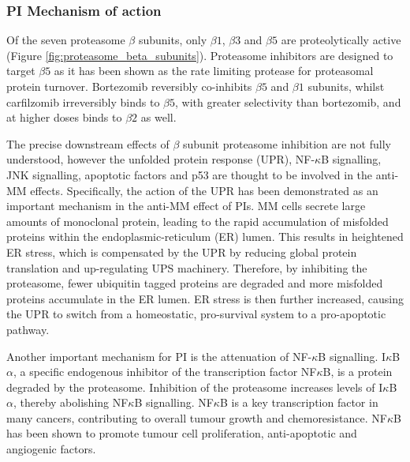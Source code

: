 \subsubsection{PI Mechanism of action}
Of the seven proteasome $\beta$ subunits, only $\beta1$, $\beta3$ and $\beta5$ are proteolytically active (Figure \ref{fig:proteasome_beta_subunits}). Proteasome inhibitors are designed to target $\beta5$ as it has been shown as the rate limiting protease for proteasomal protein turnover\cite{besse2019proteasome}. Bortezomib reversibly co-inhibits $\beta5$ and $\beta1$ subunits, whilst carfilzomib irreversibly binds to $\beta5$, with greater selectivity than bortezomib, and at higher doses binds to $\beta2$ as well\cite{besse2019proteasome}.

The precise downstream effects of $\beta$ subunit proteasome inhibition are not fully understood, however the unfolded protein response (UPR), NF-$\kappa$B signalling, JNK signalling, apoptotic factors and p53 are thought to be involved in the anti-MM effects\cite{kubiczkova2014proteasome}.
Specifically, the action of the UPR has been demonstrated as an important mechanism in the anti-MM effect of PIs.
MM cells secrete large amounts of monoclonal protein, leading to the rapid accumulation of  misfolded proteins within the endoplasmic-reticulum (ER) lumen.
This results in heightened ER stress, which is compensated by the UPR by reducing global protein translation and up-regulating UPS machinery\cite{wallington2018resistance}.
Therefore, by inhibiting the proteasome, fewer ubiquitin tagged proteins are degraded and more misfolded proteins accumulate in the ER lumen.
ER stress is then further increased, causing the UPR to switch from a homeostatic, pro-survival system to a pro-apoptotic pathway\cite{kubiczkova2014proteasome, wallington2018resistance}.

Another important mechanism for PI is the attenuation of NF-$\kappa$B signalling. I$\kappa$B$\alpha$, a specific endogenous inhibitor of the transcription factor NF$\kappa$B, is a protein degraded by the proteasome.
Inhibition of the proteasome increases levels of I$\kappa$B$\alpha$, thereby abolishing NF$\kappa$B signalling.
NF$\kappa$B is a key transcription factor in many cancers, contributing to overall tumour growth and chemoresistance.
NF$\kappa$B has been shown to promote tumour cell proliferation, anti-apoptotic and angiogenic factors\cite{kale2012molecular}.

